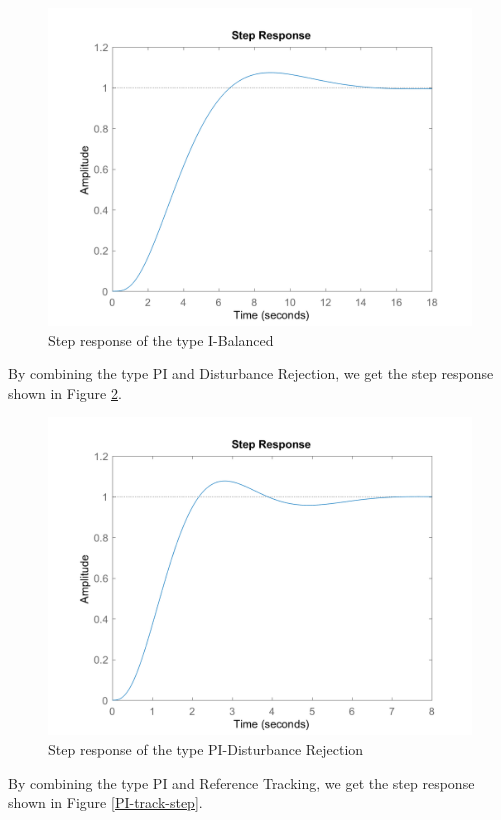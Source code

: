 \documentclass[a4paper, twocolumn, titlepage, 10pt]{article}
\begin{document}
	\begin{figure}[H]
		\centering
		\includegraphics[width=\linewidth]{I-balance-step}
		\caption{Step response of the type I-Balanced}
		\label{I-balance-step}
	\end{figure}
			   	By combining the type PI and Disturbance Rejection, we get the step response shown in Figure \ref{PI-rej-step}.
		\begin{figure}[H]
			\centering
			\includegraphics[width=\linewidth]{PI-rej-step}
			\caption{Step response of the type PI-Disturbance Rejection}
			\label{PI-rej-step}
		\end{figure}
					   	By combining the type PI and Reference Tracking, we get the step response shown in Figure \ref{PI-track-step}.
\end{document}
